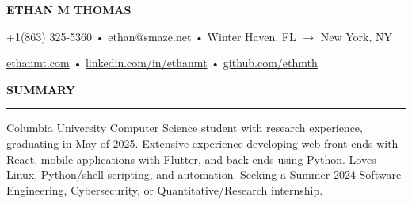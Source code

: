 \documentclass[11pt,letterpaper]{article}
\begin{document}
\begingroup
\centerline{\MakeUppercase{\LARGE\bf Ethan M Thomas}} \medskip
\endgroup

\begingroup
\centerline{+1(863) 325-5360 • ethan@smaze.net • Winter Haven, FL $\rightarrow$ New York, NY}
\endgroup
\par

\begingroup
\centerline{\href{www.ethanmt.com}{ethanmt.com} • \href{https://www.linkedin.com/in/ethanmt/}{linkedin.com/in/ethanmt} • \href{https://github.com/ethmth}{github.com/ethmth}}
\endgroup
\par


\medskip
\MakeUppercase{{\bf Summary}} %
\medskip
\hrule %
\begin{list}{}{\setlength{\leftmargin}{0em}}
    \item
          {Columbia University Computer Science student with research experience, graduating in May of 2025.
          Extensive experience developing web front-ends with React, mobile applications with Flutter, and back-ends using Python.
          Loves Linux, Python/shell scripting, and automation.
          Seeking a Summer 2024 Software Engineering, Cybersecurity, or Quantitative/Research internship.}
\end{list}


\end{document}
